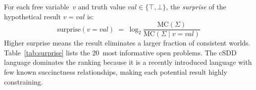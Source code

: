 \documentclass[10pt]{article}
\theoremstyle{plain}
\theoremstyle{definition}
\theoremstyle{remark}
\begin{document}
For each free variable~$v$ and truth value $\textit{val} \in \{\top, \bot\}$, the \emph{surprise} of the hypothetical result $v = \textit{val}$ is:
\[
  \text{surprise}(v = \textit{val}) \;=\; \log_2 \frac{\text{MC}(\Sigma)}{\text{MC}(\Sigma \mid v = \textit{val})}
\]
Higher surprise means the result eliminates a larger fraction of consistent worlds. Table~\ref{tab:surprise} lists the 20~most informative open problems. The cSDD language dominates the ranking because it is a recently introduced language with few known succinctness relationships, making each potential result highly constraining.
\end{document}

